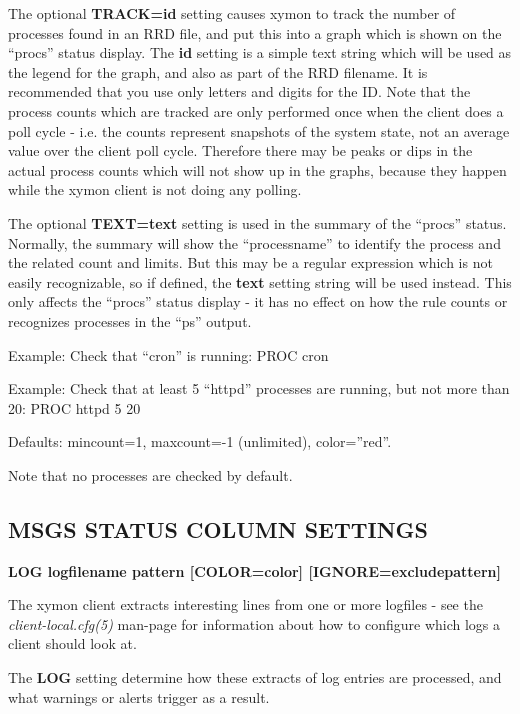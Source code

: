   The optional \textbf{TRACK=id}
 setting causes xymon to track the number of processes found in an RRD file, and put this into a graph which is shown on the ``procs'' status display. The \textbf{id}
 setting is a simple text string which will be used as the legend for the graph, and also as part of the RRD filename. It is recommended that you use only letters and digits for the ID.  
 Note that the process counts which are tracked are only performed once when the client does a poll cycle - i.e. the counts represent snapshots of the system state, not an average value over the client poll cycle. Therefore there may be peaks or dips in the actual process counts which will not show up in the graphs, because they happen while the xymon client is not doing any polling. 


  The optional \textbf{TEXT=text}
 setting is used in the summary of the ``procs'' status. Normally, the summary will show the ``processname'' to identify the process and the related count and limits. But this may be a regular expression which is not easily recognizable, so if defined, the \textbf{text}
 setting string will be used instead. This only affects the ``procs'' status display - it has no effect on how the rule counts or recognizes processes in the ``ps'' output. 


  Example: Check that ``cron'' is running:  
PROC cron 



  Example: Check that at least 5 ``httpd'' processes are running, but not more than 20:  
PROC httpd 5 20 



  Defaults:  
mincount=1, maxcount=-1 (unlimited), color=''red''. 
 
Note that no processes are checked by default. 



 
\subsection{MSGS STATUS COLUMN SETTINGS}


 \textbf{LOG logfilename pattern [COLOR=color] [IGNORE=excludepattern]}



  The xymon client extracts interesting lines from one or more logfiles - see the \emph{client-local.cfg(5)}
 man-page for information about how to configure which logs a client should look at. 


  The \textbf{LOG}
 setting determine how these extracts of log entries are processed, and what warnings or alerts trigger as a result. 


